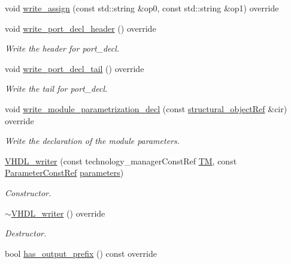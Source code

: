 \begin{DoxyCompactItemize}
void \hyperlink{structVHDL__writer_af48ed8414cfbd1a7713d3bab7b4b5218}{write\+\_\+assign} (const std\+::string \&op0, const std\+::string \&op1) override
\item 
void \hyperlink{structVHDL__writer_a19481913996a5ac739d788aa43f9a2a9}{write\+\_\+port\+\_\+decl\+\_\+header} () override
\begin{DoxyCompactList}\small\item\em Write the header for port\+\_\+decl. \end{DoxyCompactList}\item 
void \hyperlink{structVHDL__writer_af421fa8d57e933193276a0cb76ccd0a3}{write\+\_\+port\+\_\+decl\+\_\+tail} () override
\begin{DoxyCompactList}\small\item\em Write the tail for port\+\_\+decl. \end{DoxyCompactList}\item 
void \hyperlink{structVHDL__writer_a0c54febb526f68c5d71314576086ec3b}{write\+\_\+module\+\_\+parametrization\+\_\+decl} (const \hyperlink{structural__objects_8hpp_a8ea5f8cc50ab8f4c31e2751074ff60b2}{structural\+\_\+object\+Ref} \&cir) override
\begin{DoxyCompactList}\small\item\em Write the declaration of the module parameters. \end{DoxyCompactList}\item 
\hyperlink{structVHDL__writer_a710c73d9ba012835d394917ee0a45488}{V\+H\+D\+L\+\_\+writer} (const technology\+\_\+manager\+Const\+Ref \hyperlink{structVHDL__writer_a1229d2102ce3fd2c45b9848483e0bd0f}{TM}, const \hyperlink{Parameter_8hpp_a37841774a6fcb479b597fdf8955eb4ea}{Parameter\+Const\+Ref} \hyperlink{classlanguage__writer_aeb717c1d12571e3808759009be752d59}{parameters})
\begin{DoxyCompactList}\small\item\em Constructor. \end{DoxyCompactList}\item 
\hyperlink{structVHDL__writer_afc4d892a2ca0e9def482be137208a7b5}{$\sim$\+V\+H\+D\+L\+\_\+writer} () override
\begin{DoxyCompactList}\small\item\em Destructor. \end{DoxyCompactList}\item 
bool \hyperlink{structVHDL__writer_aa1655e8fca9245faa8c9bed5956d079a}{has\+\_\+output\+\_\+prefix} () const override
\item 

\end{DoxyCompactItemize}
